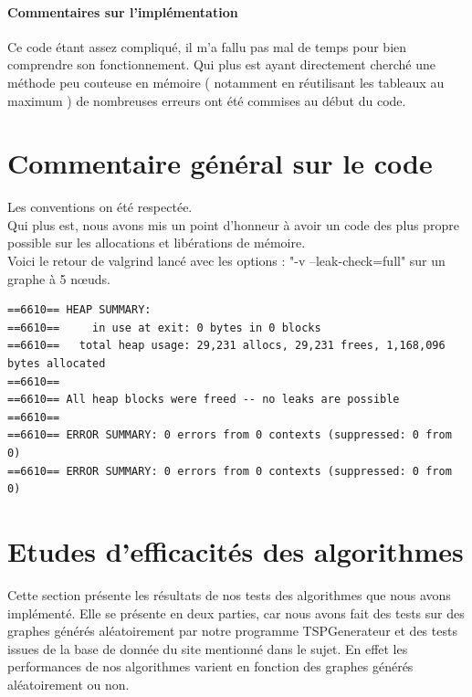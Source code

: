\documentclass[10pt,a4paper]{report}
\begin{document}
		\paragraph{Commentaires sur l'implémentation\\}
		Ce code étant assez compliqué, il m'a fallu pas mal de temps pour bien comprendre son fonctionnement. Qui plus est ayant directement cherché une méthode peu couteuse en mémoire ( notamment en réutilisant les tableaux au maximum ) de nombreuses erreurs ont été commises au début du code.
		
\newpage	

\section{Commentaire général sur le code}

\begin{flushleft}
Les conventions on été respectée. \\
Qui plus est, nous avons mis un point d'honneur à avoir un code des plus propre possible sur les allocations et libérations de mémoire. \\

Voici le retour de valgrind lancé avec les options : "-v --leak-check=full" sur un graphe à 5 nœuds. \\
\end{flushleft}
\begin{verbatim}
==6610== HEAP SUMMARY:
==6610==     in use at exit: 0 bytes in 0 blocks
==6610==   total heap usage: 29,231 allocs, 29,231 frees, 1,168,096 bytes allocated
==6610== 
==6610== All heap blocks were freed -- no leaks are possible
==6610== 
==6610== ERROR SUMMARY: 0 errors from 0 contexts (suppressed: 0 from 0)
==6610== ERROR SUMMARY: 0 errors from 0 contexts (suppressed: 0 from 0)
\end{verbatim}



\newpage
\section{Etudes d'efficacités des algorithmes}
	\begin{flushleft}
	Cette section présente les résultats de nos tests des algorithmes que nous avons implémenté. Elle se présente en deux parties, car nous avons fait des tests sur des graphes générés aléatoirement par notre programme TSPGenerateur et des tests issues de la base de donnée du site mentionné dans le sujet. En effet les performances de nos algorithmes varient en fonction des graphes générés aléatoirement ou non.
	\end{flushleft}
\end{document}
